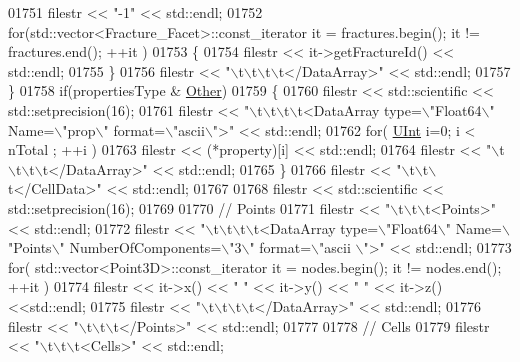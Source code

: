 \begin{DoxyCode}
01751             filestr << \textcolor{stringliteral}{"-1"} << std::endl;
01752         \textcolor{keywordflow}{for}(std::vector<Fracture\_Facet>::const\_iterator it = fractures.begin(); it != fractures.end(); ++it
       )
01753         \{
01754             filestr << it->getFractureId() << std::endl;
01755         \}
01756         filestr << \textcolor{stringliteral}{"\(\backslash\)t\(\backslash\)t\(\backslash\)t\(\backslash\)t</DataArray>"} << std::endl;
01757     \}
01758     \textcolor{keywordflow}{if}(propertiesType & \hyperlink{namespaceFVCode3D_ab3abc77722284ce4344be90bb61c1a41ab8c2eb493dc98b25b8fc2e3e176d4892}{Other})
01759     \{
01760         filestr << std::scientific << std::setprecision(16);
01761         filestr << \textcolor{stringliteral}{"\(\backslash\)t\(\backslash\)t\(\backslash\)t\(\backslash\)t<DataArray type=\(\backslash\)"Float64\(\backslash\)" Name=\(\backslash\)"prop\(\backslash\)" format=\(\backslash\)"ascii\(\backslash\)">"} << std::endl;
01762         \textcolor{keywordflow}{for}( \hyperlink{namespaceFVCode3D_a4bf7e328c75d0fd504050d040ebe9eda}{UInt} i=0; i < nTotal ; ++i )
01763             filestr << (*property)[i] << std::endl;
01764         filestr << \textcolor{stringliteral}{"\(\backslash\)t\(\backslash\)t\(\backslash\)t\(\backslash\)t</DataArray>"} << std::endl;
01765     \}
01766     filestr << \textcolor{stringliteral}{"\(\backslash\)t\(\backslash\)t\(\backslash\)t</CellData>"} << std::endl;
01767 
01768     filestr << std::scientific << std::setprecision(16);
01769 
01770     \textcolor{comment}{// Points}
01771     filestr << \textcolor{stringliteral}{"\(\backslash\)t\(\backslash\)t\(\backslash\)t<Points>"} << std::endl;
01772     filestr << \textcolor{stringliteral}{"\(\backslash\)t\(\backslash\)t\(\backslash\)t\(\backslash\)t<DataArray type=\(\backslash\)"Float64\(\backslash\)" Name=\(\backslash\)"Points\(\backslash\)" NumberOfComponents=\(\backslash\)"3\(\backslash\)" format=\(\backslash\)"ascii
      \(\backslash\)">"} << std::endl;
01773     \textcolor{keywordflow}{for}( std::vector<Point3D>::const\_iterator it = nodes.begin(); it != nodes.end(); ++it )
01774         filestr << it->x() << \textcolor{stringliteral}{" "} << it->y() << \textcolor{stringliteral}{" "} << it->z() <<std::endl;
01775     filestr << \textcolor{stringliteral}{"\(\backslash\)t\(\backslash\)t\(\backslash\)t\(\backslash\)t</DataArray>"} << std::endl;
01776     filestr << \textcolor{stringliteral}{"\(\backslash\)t\(\backslash\)t\(\backslash\)t</Points>"} << std::endl;
01777 
01778     \textcolor{comment}{// Cells}
01779     filestr << \textcolor{stringliteral}{"\(\backslash\)t\(\backslash\)t\(\backslash\)t<Cells>"} << std::endl;

\end{DoxyCode}
